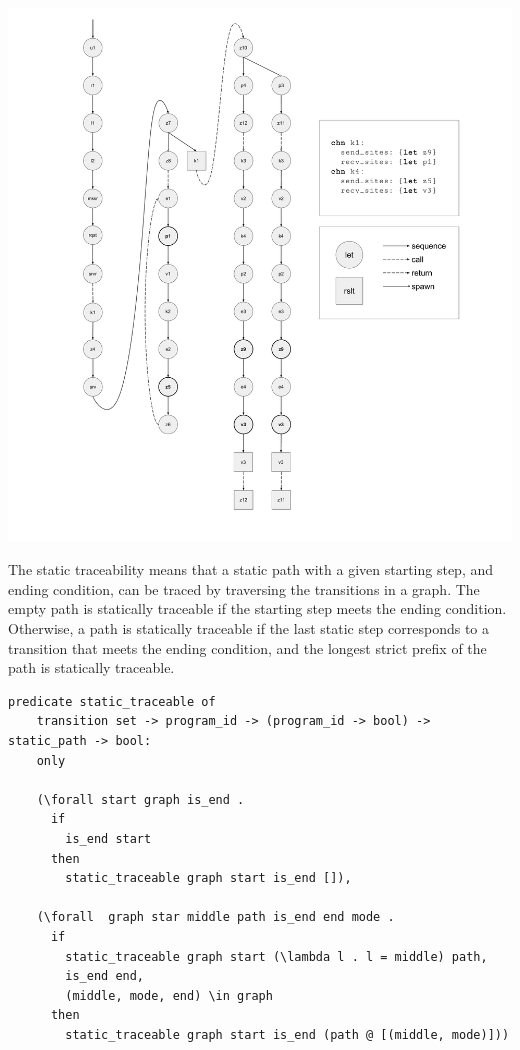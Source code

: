 \documentclass[10pt]{article}
\begin{document}
\includegraphics[width=1.3\textwidth, left]{cml_graph.pdf}

The static traceability means that a static path with a given starting step, and ending
condition, can be traced by traversing the transitions in a graph.
The empty path is statically traceable if the starting step meets the ending condition.
Otherwise, a path is statically traceable if the last static step corresponds to a transition
that meets the ending condition, and the longest strict prefix of the path is statically
traceable.  

\begin{lstlisting}[language=logic, mathescape]
  predicate static_traceable of
    transition set -> program_id -> (program_id -> bool) -> static_path -> bool:
    only

    (\forall start graph is_end .
      if
        is_end start
      then
        static_traceable graph start is_end []),

    (\forall  graph star middle path is_end end mode .
      if 
        static_traceable graph start (\lambda l . l = middle) path, 
        is_end end, 
        (middle, mode, end) \in graph 
      then
        static_traceable graph start is_end (path @ [(middle, mode)]))
  \end{lstlisting}
\end{document}

